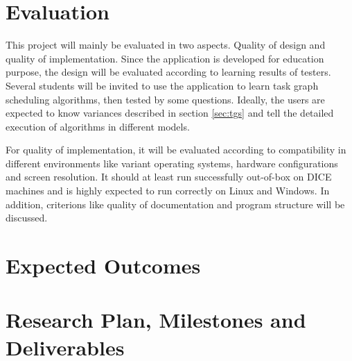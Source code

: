 \documentclass[a4paper,11pt]{article}
\begin{document}
\section{Evaluation}

This project will mainly be evaluated in two aspects. Quality of design and quality of implementation. Since the application is developed for education purpose, the design will be evaluated according to learning results of testers. Several students will be invited to use the application to learn task graph scheduling algorithms, then tested by some questions. Ideally, the users are expected to know variances described in section \ref{sec:tgs} and tell the detailed execution of algorithms in different models.

For quality of implementation, it will be evaluated according to compatibility in different environments like variant operating systems, hardware configurations and screen resolution. It should at least run successfully out-of-box on DICE machines and is highly expected to run correctly on Linux and Windows. In addition, criterions like quality of documentation and program structure will be discussed.

\section{Expected Outcomes}




\section{Research Plan, Milestones and Deliverables}

\end{document}
